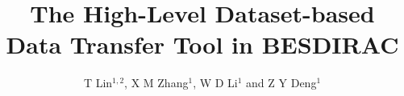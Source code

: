 \documentclass[a4paper]{jpconf}
\begin{document}
\title{The High-Level Dataset-based Data Transfer Tool in BESDIRAC}

\author{T Lin$^{1,2}$, X M Zhang$^1$, W D Li$^1$ and Z Y Deng$^1$}
\address{$^1$ Institute of High Energy Physics, 
            19B Yuquan Road,
            Beijing 100049,
            People's Republic of China}
\address{$^2$ University of Chinese Academy Sciences,
            19A Yuquan Road,
            Beijing 100049,
            People's Republic of China}












\end{document}
